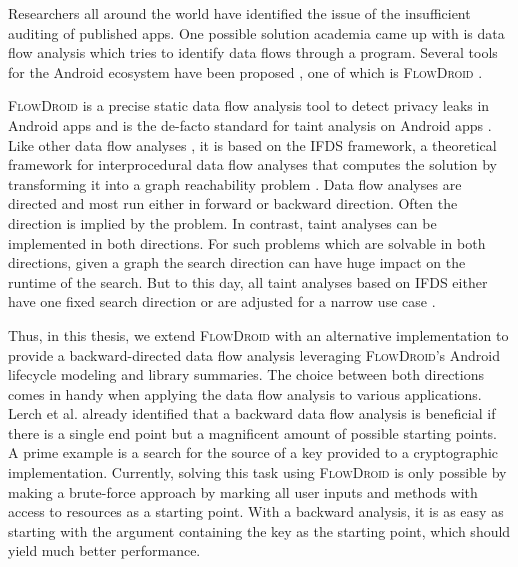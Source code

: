 \documentclass[../draft.tex]{subfiles}
\begin{document}
    Researchers all around the world have identified the issue of the insufficient auditing of published apps.
    One possible solution academia came up with is data flow analysis which tries to identify data flows through a program.
    Several tools for the Android ecosystem have been proposed \cite{Gibler2012, Zhao2012, Yang2012, Mann2012}, one of which is \textsc{FlowDroid} \cite{Arzt2014}.

    \textsc{FlowDroid} is a precise static data flow analysis tool to detect privacy leaks in Android apps and is the de-facto standard for taint analysis on Android apps \cite{Arzt2014}.
    Like other data flow analyses \cite{Lerch2014,NguyenQuangDo2017,Allen2021}, it is based on the IFDS framework, a theoretical framework for interprocedural data flow analyses that computes the solution by transforming it into a graph reachability problem \cite{Reps1995}.
    Data flow analyses are directed and most run either in forward or backward direction.
    Often the direction is implied by the problem. In contrast, taint analyses can be implemented in both directions.
    For such problems which are solvable in both directions, given a graph the search direction can have huge impact on the runtime of the search.    
    But to this day, all taint analyses based on IFDS either have one fixed search direction \cite{Arzt2014,Allen2021,NguyenQuangDo2017} or are adjusted for a narrow use case \cite{Lerch2014}.

    Thus, in this thesis, we extend \textsc{FlowDroid} with an alternative implementation to provide a backward-directed data flow analysis leveraging \textsc{FlowDroid}'s Android lifecycle modeling and library summaries.
    The choice between both directions comes in handy when applying the data flow analysis to various applications. Lerch et al.\cite{Lerch2014} already identified that a backward data flow analysis is beneficial if there is a single end point but a magnificent amount of possible starting points.
    A prime example is a search for the source of a key provided to a cryptographic implementation.
    Currently, solving this task using \textsc{FlowDroid} is only possible by making a brute-force approach by marking all user inputs and methods with access to resources as a starting point.
    With a backward analysis, it is as easy as starting with the argument containing the key as the starting point, which should yield much better performance.
\end{document}
